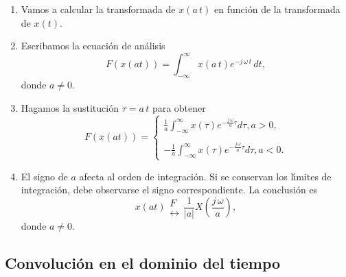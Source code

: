\begin{enumerate}
	
\item Vamos a calcular la transformada de $x(a \, t)$ en función de la transformada de $x(t)$.
 
\item Escribamos la ecuaci\'{o}n de an\'{a}lisis
\begin{equation}
F\left( x\left( at\right) \right) =\int_{-\infty }^{\infty }x\left(
a \, t\right) e^{-j \, \omega \, t} \, dt,
\end{equation}
donde $a\neq 0.$ 

\item Hagamos la sustituci\'{o}n $\tau =a \, t$ para obtener
\begin{equation}
F\left( x\left( at\right) \right) =\left\{ 
\begin{array}{c}
\frac{1}a\int_{-\infty }^{\infty }x\left( \tau \right) e^{-\frac{j \, \omega 
}a\tau }d\tau , a>0, \\ 
\\ 
-\frac{1}a\int_{-\infty }^{\infty }x\left( \tau \right) e^{-\frac{j \, \omega 
}a\tau }d\tau , a<0.
\end{array}
\right.
\end{equation}

\item El signo de $a$ afecta al orden de integraci\'{o}n. Si se conservan los
l\'{\i}mites de integraci\'{o}n, debe observarse el signo correspondiente. La
conclusi\'{o}n es 
\begin{equation}
x\left( at\right) 
\begin{array}{l}
F \\ 
\leftrightarrow
\end{array}
\frac{1}{\left| a\right| }X\left( \frac{j \, \omega }a\right) ,
\end{equation}
donde $a\neq 0.$

\end{enumerate}

\subsection{Convoluci\'{o}n en el dominio del tiempo}

